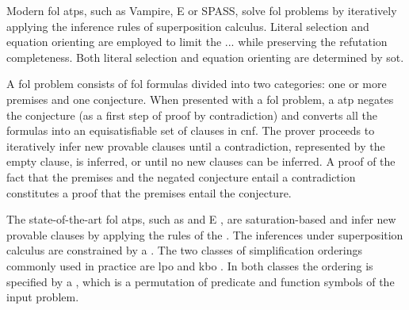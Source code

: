 

Modern \gls{fol} \glspl{atp}, such as Vampire, E or SPASS,
solve \gls{fol} problems by iteratively applying the inference rules of superposition calculus.
Literal selection and equation orienting are employed to limit the ... while preserving the refutation completeness.
Both literal selection and equation orienting are determined by \gls{sot}.

A \gls{fol} problem consists of \gls{fol} formulas divided into two categories:
one or more premises and one conjecture.
When presented with a \gls{fol} problem,
a  \gls{atp} negates the conjecture (as a first step of proof by contradiction)
and converts all the formulas into an equisatisfiable set of clauses in \gls{cnf}.
The prover proceeds to iteratively infer new provable clauses
until a contradiction, represented by the empty clause, is inferred,
or until no new clauses can be inferred.
A proof of the fact that the premises and the negated conjecture entail a contradiction
constitutes a proof that the premises entail the conjecture.

The state-of-the-art \gls{fol} \glspl{atp},
such as \vampire{} \cite{10.1007/978-3-642-39799-8_1} and E \cite{10.1007/978-3-030-29436-6_29},
are saturation-based and
infer new provable clauses by applying the rules of the .
The inferences under superposition calculus are constrained by a .
The two classes of simplification orderings commonly used in practice are
\gls{lpo} \cite{Kamin1980} and \gls{kbo} \cite{Knuth1983}.
In both classes the ordering is specified by a ,
which is a permutation of predicate and function symbols of the input problem.

